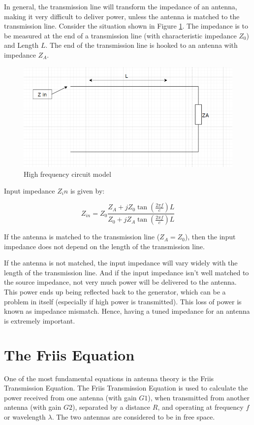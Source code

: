 \documentclass[a4paper,12pt]{report}
\begin{document}
In general, the transmission line will transform the impedance of an antenna,
making it very difficult to deliver power,
unless the antenna is matched to the transmission line.
Consider the situation shown in Figure \ref{fig:high_freq_circuit_diagram}.
The impedance is to be measured at the end of a transmission line
(with characteristic impedance $Z_0$) and Length $L$.
The end of the transmission line is hooked to an antenna with impedance $Z_A$.

\begin{figure}
  \begin{center}
    \includegraphics[clip, keepaspectratio, width=0.5\linewidth]{img/high_freq_circuit_diagram.png}
    \caption{High frequency circuit model}
    \label{fig:high_freq_circuit_diagram}
  \end{center}
\end{figure}

Input impedance $Z_in$ is given by:

\begin{equation}
  Z_{in} = Z_0 \frac{Z_A + j Z_0 \tan(\frac{2\pi f}{c}) L}{Z_0 + j Z_A \tan(\frac{2\pi f}{c}) L}
\end{equation}

If the antenna is matched to the transmission line ($Z_A=Z_0$),
then the input impedance does not depend on the length of the transmission line.

If the antenna is not matched,
the input impedance will vary widely with the length of the transmission line.
And if the input impedance isn't well matched to the source impedance,
not very much power will be delivered to the antenna.
This power ends up being reflected back to the generator,
which can be a problem in itself (especially if high power is transmitted).
This loss of power is known as impedance mismatch.
Hence, having a tuned impedance for an antenna is extremely important.

\section{The Friis Equation}

One of the most fundamental equations in antenna theory is the Friis Transmission Equation.
The Friis Transmission Equation is used to calculate the power
received from one antenna
(with gain $G1$), when transmitted from another antenna (with gain $G2$),
separated by a distance $R$, and operating at frequency $f$ or wavelength $\lambda$. 
The two antennas are considered to be in free space.
\end{document}
